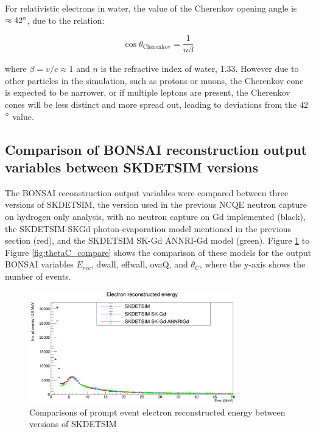  For relativistic electrons in water, the value of the Cherenkov opening angle is $\approx 42\degree$, due to the relation: 

 \begin{equation}
\cos \theta_{\mathrm{Cherenkov}}=\frac{1}{n\beta}
\label{cherenkov_angle}
\end{equation}
 
where $\beta = v/c \approx 1$ and $n$ is the refractive index of water, 1.33. However due to other particles in the simulation, such as protons or muons, the Cherenkov cone is expected to be narrower, or if multiple leptons are present, the Cherenkov cones will be less distinct and more spread out, leading to deviations from the 42$\degree$ value. 

\subsection{Comparison of BONSAI reconstruction output variables between SKDETSIM versions}

The BONSAI reconstruction output variables were compared between three versions of SKDETSIM, the version used in the previous NCQE neutron capture on hydrogen only analysis, with no neutron capture on Gd implemented (black), the SKDETSIM-SKGd photon-evaporation model mentioned in the previous section (red), and the SKDETSIM SK-Gd ANNRI-Gd model (green). Figure \ref{fig:erec_compare} to Figure \ref{fig:thetaC_compare} shows the comparison of these models for the output BONSAI variables $E_{rec}$, dwall, effwall, ovaQ, and $\theta_C$, where the y-axis shows the number of events.

\begin{figure}
    \centering
    \includegraphics[width=0.8\textwidth]{Figures/erec_compare.png}
    \caption{Comparisons of prompt event electron reconstructed energy between versions of SKDETSIM}
    \label{fig:erec_compare}

\end{figure}

